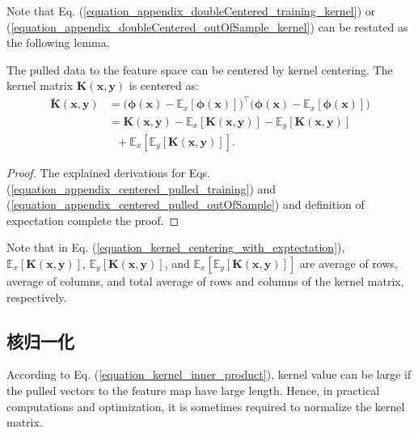 \documentclass[lang=cn,10pt]{gorgeousnbook}
\numberwithin{equation}{section}%
\numberwithin{figure}{section}%
\begin{document}
Note that Eq. (\ref{equation_appendix_doubleCentered_training_kernel}) or  (\ref{equation_appendix_doubleCentered_outOfSample_kernel}) can be restated as the following lemma.
\begin{lemma}\label{lemma_kernel_centering}
The pulled data to the feature space can be centered by kernel centering. The kernel matrix $\boldsymbol{K}(\boldsymbol{x},\boldsymbol{y})$ is centered as:
\begin{align}
\breve{\boldsymbol{K}}(\boldsymbol{x},\boldsymbol{y}) &= \big(\boldsymbol{\phi}(\boldsymbol{x}) - \mathbb{E}_x[\boldsymbol{\phi}(\boldsymbol{x})]\big)^\top \big(\boldsymbol{\phi}(\boldsymbol{x}) - \mathbb{E}_x[\boldsymbol{\phi}(\boldsymbol{x})]\big) \nonumber \\
&= \boldsymbol{K}(\boldsymbol{x}, \boldsymbol{y}) - \mathbb{E}_x[\boldsymbol{K}(\boldsymbol{x}, \boldsymbol{y})] - \mathbb{E}_y[\boldsymbol{K}(\boldsymbol{x}, \boldsymbol{y})] \nonumber \\
&~~~ + \mathbb{E}_x[\mathbb{E}_y[\boldsymbol{K}(\boldsymbol{x}, \boldsymbol{y})]]. \label{equation_kernel_centering_with_exptectation}
\end{align}
\end{lemma}
\begin{proof}
The explained derivations for Eqs. (\ref{equation_appendix_centered_pulled_training}) and (\ref{equation_appendix_centered_pulled_outOfSample}) and definition of expectation complete the proof.
\end{proof}
Note that in Eq. (\ref{equation_kernel_centering_with_exptectation}), $\mathbb{E}_x[\boldsymbol{K}(\boldsymbol{x}, \boldsymbol{y})]$, $\mathbb{E}_y[\boldsymbol{K}(\boldsymbol{x}, \boldsymbol{y})]$, and $\mathbb{E}_x[\mathbb{E}_y[\boldsymbol{K}(\boldsymbol{x}, \boldsymbol{y})]]$ are average of rows, average of columns, and total average of rows and columns of the kernel matrix, respectively.

\subsection{核归一化}

According to Eq. (\ref{equation_kernel_inner_product}), kernel value can be large if the pulled vectors to the feature map have large length. Hence, in practical computations and optimization, it is sometimes required to normalize the kernel matrix. 
\end{document}
